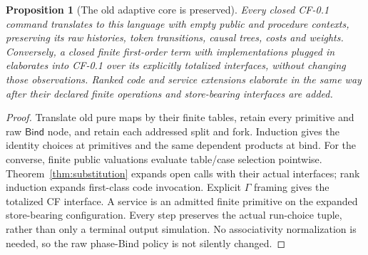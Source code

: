\documentclass[11pt,a4paper]{article}
\newtheorem{proposition}[theorem]{Proposition}
\theoremstyle{definition}
\newcommand{\Bind}{\mathsf{Bind}}
\begin{document}
\begin{proposition}[The old adaptive core is preserved]\label{prop:conservative}
Every closed CF-0.1 command translates to this language with empty public
and procedure contexts, preserving its raw histories, token transitions,
causal trees, costs and weights. Conversely, a closed finite first-order
term with implementations plugged in elaborates into CF-0.1 over its
explicitly totalized interfaces, without changing those observations.
Ranked code and service extensions elaborate in the same way after their
declared finite operations and store-bearing interfaces are added.
\end{proposition}
\begin{proof}
Translate old pure maps by their finite tables, retain every primitive and
raw $\Bind$ node, and retain each addressed split and fork. Induction gives
the identity choices at primitives and the same dependent products at bind.
For the converse, finite public valuations evaluate table/case selection
pointwise. Theorem~\ref{thm:substitution} expands open calls with their
actual interfaces; rank induction expands first-class code invocation.
Explicit $\Gamma$ framing gives the totalized CF interface. A service is
an admitted finite primitive on the expanded store-bearing configuration.
Every step preserves the actual run-choice tuple, rather than only a
terminal output simulation. No associativity normalization is needed, so
the raw phase-Bind policy is not silently changed.
\end{proof}
\end{document}
